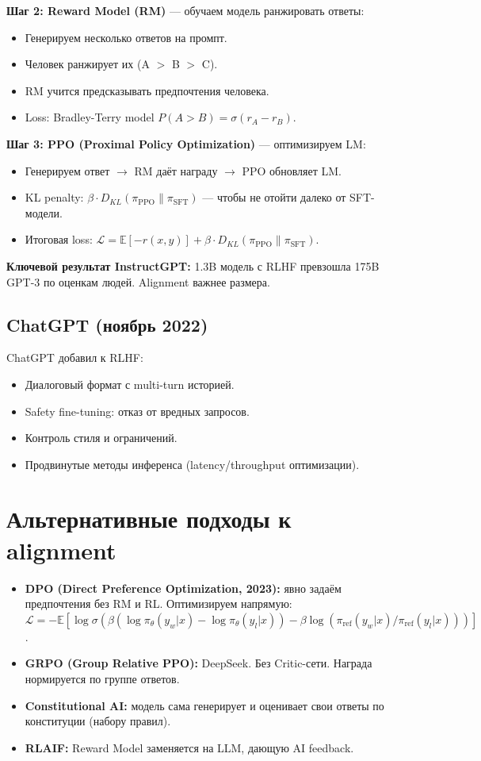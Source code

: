 \documentclass[a4paper,12pt]{article}
\begin{document}
\textbf{Шаг 2: Reward Model (RM)} --- обучаем модель ранжировать ответы:
\begin{itemize}
    \item Генерируем несколько ответов на промпт.
    \item Человек ранжирует их (A $>$ B $>$ C).
    \item RM учится предсказывать предпочтения человека.
    \item Loss: Bradley-Terry model $P(A > B) = \sigma(r_A - r_B)$.
\end{itemize}

\textbf{Шаг 3: PPO (Proximal Policy Optimization)} --- оптимизируем LM:
\begin{itemize}
    \item Генерируем ответ $\to$ RM даёт награду $\to$ PPO обновляет LM.
    \item KL penalty: $\beta \cdot D_{KL}(\pi_{\text{PPO}} \parallel \pi_{\text{SFT}})$ --- чтобы не отойти далеко от SFT-модели.
    \item Итоговая loss: $\mathcal{L} = \mathbb{E}[-r(x, y)] + \beta \cdot D_{KL}(\pi_{\text{PPO}} \parallel \pi_{\text{SFT}})$.
\end{itemize}

\textbf{Ключевой результат InstructGPT:} 1.3B модель с RLHF превзошла 175B GPT-3 по оценкам людей. Alignment важнее размера.

\subsection{ChatGPT (ноябрь 2022)}
ChatGPT добавил к RLHF:
\begin{itemize}
    \item Диалоговый формат с multi-turn историей.
    \item Safety fine-tuning: отказ от вредных запросов.
    \item Контроль стиля и ограничений.
    \item Продвинутые методы инференса (latency/throughput оптимизации).
\end{itemize}

\section{Альтернативные подходы к alignment}

\begin{itemize}
    \item \textbf{DPO (Direct Preference Optimization, 2023):} явно задаём предпочтения без RM и RL. Оптимизируем напрямую: $\mathcal{L} = -\mathbb{E}[\log \sigma(\beta(\log \pi_\theta(y_w|x) - \log \pi_\theta(y_l|x)) - \beta \log(\pi_{\text{ref}}(y_w|x) / \pi_{\text{ref}}(y_l|x)))]$.
    \item \textbf{GRPO (Group Relative PPO):} DeepSeek. Без Critic-сети. Награда нормируется по группе ответов.
    \item \textbf{Constitutional AI:} модель сама генерирует и оценивает свои ответы по конституции (набору правил).
    \item \textbf{RLAIF:} Reward Model заменяется на LLM, дающую AI feedback.
\end{itemize}
\end{document}
